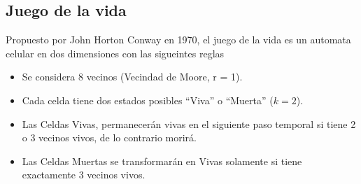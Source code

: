 \subsection{Juego de la vida}\label{subsec:juego-de-la-vida}
Propuesto por John Horton Conway en 1970, el juego de la vida es un automata celular en dos dimensiones con las sigueintes reglas
\begin{itemize}
    \item Se considera 8 vecinos (Vecindad de Moore, r = 1).
    \item Cada celda tiene dos estados posibles “Viva” o “Muerta” ($k=2$).
    \item Las Celdas Vivas, permanecerán vivas en el siguiente paso temporal si tiene 2 o 3 vecinos vivos, de lo contrario morirá.
    \item Las Celdas Muertas se transformarán en Vivas solamente si tiene exactamente 3 vecinos vivos.
\end{itemize}
